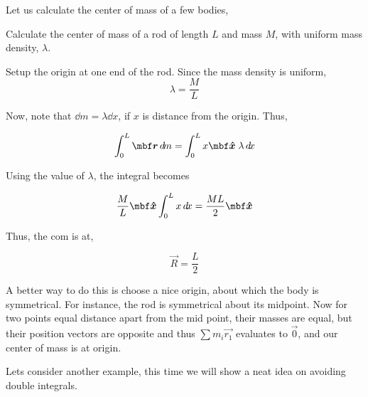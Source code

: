 Let us calculate the center of mass of a few bodies, 

\begin{example}
    Calculate the center of mass of a rod of length \(L\) and mass \(M\), with uniform mass density, \(\lambda\).

    \begin{soln}
        Setup the origin at one end of the rod. Since the mass density is uniform, 
        \begin{equation*}
            \lambda = \frac{M}{L}
        \end{equation*}

        Now, note that \(\dd{m} = \lambda \dd{x}\), if \(x\) is distance from the origin. Thus,

        \begin{equation*}
            \int_{0}^{L} \vec{r} \dd{m} = \int_{0}^{L} x\unitv{x}\;\lambda \dd{x}
        \end{equation*}

        Using the value of \(\lambda\), the integral becomes

        \begin{equation*}
            \frac{M}{L} \unitv{x} \int_{0}^{L} x \dd{x} = \frac{ML}{2} \unitv{x} 
        \end{equation*}

        Thus, the com is at, 

        \begin{equation}
            \vec{R} = \frac{L}{2}
        \end{equation}

    \end{soln}
\end{example}

A better way to do this is choose a nice origin, about which the body is symmetrical. For instance, 
the rod is symmetrical about its midpoint. Now for two points equal distance apart from the mid point,
their masses are equal, but their position vectors are opposite and thus \(\sum m_i\vec{r_1}\) evaluates 
to \(\vec{0}\), and our center of mass is at origin.

Lets consider another example, this time we will show a neat idea on avoiding double 
integrals.


\begin{marginfigure}
    \centering
\end{marginfigure}

